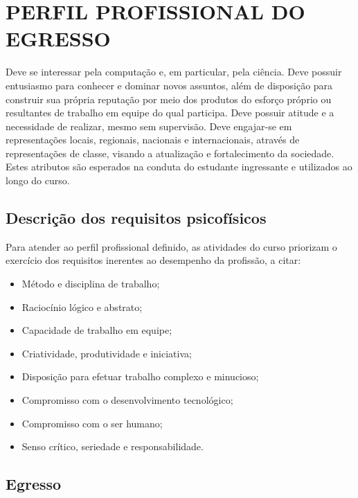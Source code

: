 \documentclass[
	12pt,				%
	openright,			%
  oneside,     %
	a4paper,			%
	chapter=TITLE,		%
	english,			%
	french,				%
	spanish,			%
	brazil				%
	]{abntex2}
\begin{document}
%
%



\chapter{PERFIL PROFISSIONAL DO EGRESSO}

Deve se interessar pela computação e, em particular, pela ciência. Deve possuir entusiasmo para conhecer e dominar novos assuntos, além de disposição para construir sua própria reputação por meio dos produtos do esforço próprio ou resultantes de trabalho em equipe do qual participa. Deve possuir atitude e a necessidade de realizar, mesmo sem supervisão. Deve engajar-se em representações locais, regionais, nacionais e internacionais, através de representações de classe, visando a atualização e fortalecimento da sociedade. Estes atributos são esperados na conduta do estudante ingressante e utilizados ao longo do curso.

\section{Descrição dos requisitos psicofísicos}

Para atender ao perfil profissional definido, as atividades do curso priorizam o exercício dos requisitos inerentes ao desempenho da profissão, a citar:

\begin{itemize}
    \item Método e disciplina de trabalho;
    \item Raciocínio lógico e abstrato;
    \item Capacidade de trabalho em equipe;
    \item Criatividade, produtividade e iniciativa;
    \item Disposição para efetuar trabalho complexo e minucioso;
    \item Compromisso com o desenvolvimento tecnológico;
    \item Compromisso com o ser humano;
    \item Senso crítico, seriedade e responsabilidade.
\end{itemize}

\section{Egresso}
\end{document}

